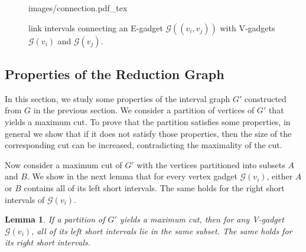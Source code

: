 \documentclass[11pt]{article}
\newtheorem{lemma}{Lemma}
\begin{document}
\begin{figure}[h!]
\centering

{
    \fontsize{8pt}{8pt}\selectfont%
    \def\svgwidth{1\textwidth}
    {images/connection.pdf_tex}
}



\caption[Short Caption]{link intervals connecting an E-gadget $\mathcal{G}((v_i, v_j))$ with V-gadgets $\mathcal{G}(v_i)$ and $\mathcal{G}(v_j)$.  }
\label{fig: connection}
\end{figure}

 
\subsection{Properties of the Reduction Graph} \label{sec: proof}

In this section, we study some properties of the interval graph $G'$ constructed from $G$ in the previous section. We consider a partition of vertices of $G'$ that yields a maximum cut. To prove that the partition satisfies some properties, in general we show that if it does not satisfy those properties, then the size of the corresponding cut can be increased, contradicting the maximality of the cut.


Now consider a maximum cut of $G'$ with the vertices partitioned into subsets $A$ and $B$. We show in the next lemma that for every vertex gadget $\mathcal{G}(v_i)$, either $A$ or $B$ contains all of its left short intervals. The same holds for the right short intervals of $\mathcal{G}(v_i)$.

\begin{lemma} \label{lem1}
 If a partition of $G'$ yields a maximum cut, then for any V-gadget $\mathcal{G}(v_i)$, all of its left short intervals lie in the same subset. The same holds for its right short intervals.
\end{lemma}
\end{document}

